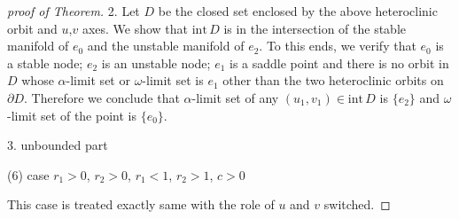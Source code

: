 \documentclass{amsart}
\def\red{\color{red}}
\theoremstyle{definition}
\numberwithin{equation}{section}
\def\ii{{\textrm{int}}\,}
\begin{document}
\begin{proof}[proof of Theorem]
2. Let $D$ be the closed set enclosed by the above heteroclinic orbit and $u$,$v$ axes. We show that $\ii D$ is in the intersection of the stable manifold of $e_0$ and the unstable manifold of $e_2$. To this ends, we verify that $e_0$ is a stable node; $e_2$ is an unstable node; $e_1$ is a saddle point and there is no orbit in $D$ whose $\alpha$-limit set or $\omega$-limit set is $e_1$ other than the two heteroclinic orbits on $\partial D$. Therefore we conclude that $\alpha$-limit set of any $(u_1,v_1) \in\ii D$ is $\{e_2\}$ and $\omega$-limit set of the point is $\{e_0\}$.
% 
% 
% 
% 
% 
% 

3. {\red unbounded part}


\bigskip \bigskip

(6) case $r_1>0$, $r_2>0$, $r_1 <1$, $r_2>1$, $c>0$

This case is treated exactly same with the role of $u$ and $v$ switched.
\bigskip\bigskip


\end{proof}
\end{document}
